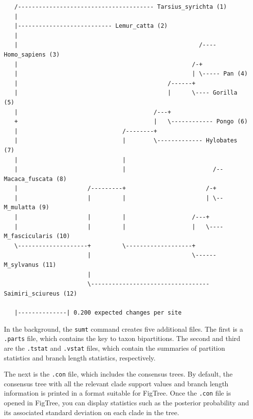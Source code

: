 \documentclass[12pt]{book}
\begin{document}
\begin{singlespacing}
\begin{verbatim}
   /--------------------------------------- Tarsius_syrichta (1)
   |                                                                               
   |--------------------------- Lemur_catta (2)
   |                                                                               
   |                                                    /---- Homo_sapiens (3)
   |                                                  /-+                          
   |                                                  | \----- Pan (4)
   |                                           /------+                            
   |                                           |      \---- Gorilla (5)
   |                                       /---+                                   
   +                                       |   \------------ Pongo (6)
   |                              /--------+                                       
   |                              |        \------------- Hylobates (7)
   |                              |                                                
   |                              |                         /-- Macaca_fuscata (8)
   |                    /---------+                       /-+                      
   |                    |         |                       | \-- M_mulatta (9)
   |                    |         |                   /---+                        
   |                    |         |                   |   \---- M_fascicularis (10)
   \--------------------+         \-------------------+                            
                        |                             \------ M_sylvanus (11)
                        |                                                          
                        \---------------------------------- Saimiri_sciureus (12)
                                                                                   
   |--------------| 0.200 expected changes per site
\end{verbatim}
\normalsize
\end{singlespacing}

In the background, the \texttt{sumt} command creates five additional files. The first is a \texttt{.parts} 
file, which contains the key to taxon bipartitions. The second and third are the \texttt{.tstat} and 
\texttt{.vstat} files, which contain the summaries of partition statistics and branch length statistics, 
respectively.

The next is the \texttt{.con} file, which includes the consensus trees. By default, the consensus tree with 
all the relevant clade support values and branch length information is printed in a format suitable for 
FigTree. Once the \texttt{.con} file is opened in FigTree, you can display statistics such as the posterior 
probability and its associated standard deviation on each clade in the tree.
\end{document}
